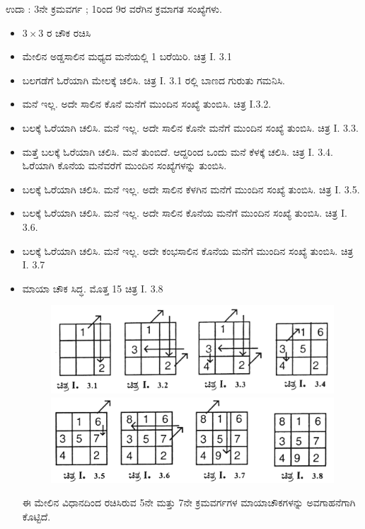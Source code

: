 ಉದಾ : 3ನೇ ಕ್ರಮವರ್ಗ ; 1ರಿಂದ 9ರ ವರೆಗಿನ ಕ್ರಮಾಗತ ಸಂಖ್ಯೆಗಳು.
\begin{itemize}
	\item $3 \times 3$ ರ ಚೌಕ ರಚಿಸಿ
	\item ಮೇಲಿನ ಅಡ್ಡಸಾಲಿನ ಮಧ್ಯದ ಮನೆಯಲ್ಲಿ 1 ಬರೆಯಿರಿ. ಚಿತ್ರ I. 3.1
	\item ಬಲಗಡೆಗೆ ಓರೆಯಾಗಿ ಮೇಲಕ್ಕೆ ಚಲಿಸಿ. ಚಿತ್ರ I. 3.1 ರಲ್ಲಿ ಬಾಣದ ಗುರುತು ಗಮನಿಸಿ.
	\item ಮನೆ ಇಲ್ಲ. ಅದೇ ಸಾಲಿನ ಕೊನೆ ಮನೆಗೆ ಮುಂದಿನ ಸಂಖ್ಯೆ ತುಂಬಿಸಿ. ಚಿತ್ರ I.3.2.
	\item ಬಲಕ್ಕೆ ಓರೆಯಾಗಿ ಚಲಿಸಿ. ಮನೆ ಇಲ್ಲ. ಅದೇ ಸಾಲಿನ ಕೊನೇ ಮನೆಗೆ ಮುಂದಿನ ಸಂಖ್ಯೆ ತುಂಬಿಸಿ. ಚಿತ್ರ I. 3.3.
	\item ಮತ್ತೆ ಬಲಕ್ಕೆ ಓರೆಯಾಗಿ ಚಲಿಸಿ. ಮನೆ ತುಂಬಿದೆ. ಆದ್ದರಿಂದ ಒಂದು ಮನೆ ಕೆಳಕ್ಕೆ ಚಲಿಸಿ. ಚಿತ್ರ I. 3.4. ಓರೆಯಾಗಿ ಕೊನೆಯ ಮನೆವರೆಗೆ ಮುಂದಿನ ಸಂಖ್ಯೆಗಳನ್ನು ತುಂಬಿಸಿ.
	\item ಬಲಕ್ಕೆ ಓರೆಯಾಗಿ ಚಲಿಸಿ. ಮನೆ ಇಲ್ಲ. ಅದೇ ಸಾಲಿನ ಕೆಳಗಿನ ಮನೆಗೆ ಮುಂದಿನ ಸಂಖ್ಯೆ ತುಂಬಿಸಿ. ಚಿತ್ರ I. 3.5.
	\item ಬಲಕ್ಕೆ ಓರೆಯಾಗಿ ಚಲಿಸಿ. ಮನೆ ಇಲ್ಲ. ಅದೇ ಸಾಲಿನ ಕೊನೆಯ ಮನೆಗೆ ಮುಂದಿನ ಸಂಖ್ಯೆ ತುಂಬಿಸಿ. ಚಿತ್ರ I. 3.6.
	\item ಬಲಕ್ಕೆ ಓರೆಯಾಗಿ ಚಲಿಸಿ. ಮನೆ ಇಲ್ಲ. ಅದೇ ಕಂಭಸಾಲಿನ ಕೊನೆಯ ಮನೆಗೆ ಮುಂದಿನ ಸಂಖ್ಯೆ ತುಂಬಿಸಿ. ಚಿತ್ರ I. 3.7
	\item ಮಾಯಾ ಚೌಕ ಸಿದ್ಧ. ಮೊತ್ತ 15 ಚಿತ್ರ I. 3.8
	\begin{figure}[h]
	\includegraphics{src/figures/chap3/fig3.6.jpg}\\
	\includegraphics{src/figures/chap3/fig3.7.jpg}
	\end{figure}
	ಈ ಮೇಲಿನ ವಿಧಾನದಿಂದ ರಚಿಸಿರುವ 5ನೇ ಮತ್ತು 7ನೇ ಕ್ರಮವರ್ಗಗಳ ಮಾಯಾಚೌಕಗಳನ್ನು ಅವಗಾಹನೆಗಾಗಿ ಕೊಟ್ಟಿದೆ.
	\begin{figure}[h]

\end{figure}
\end{itemize}
